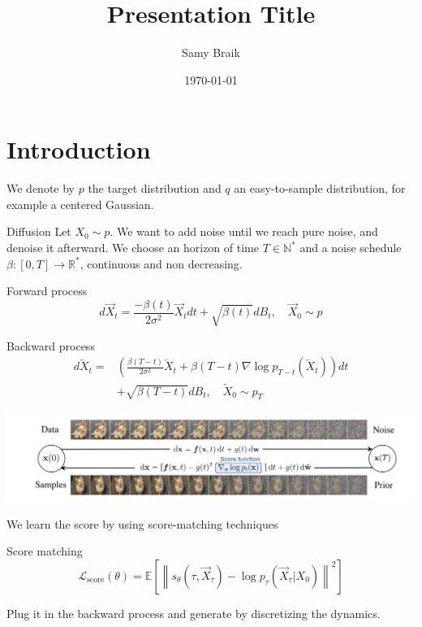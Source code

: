 \documentclass{beamer}
\title{Presentation Title}
\author{Samy Braik}
\date{\today}
\begin{document}
\begin{frame}
    \titlepage
\end{frame}

\section{Introduction}

\begin{frame}
    We denote by \(p\) the target distribution and \(q\) an easy-to-sample distribution, for example a centered Gaussian.
\end{frame}

\begin{frame}{Diffusion}
    Let \(X_0\sim p\). We want to add noise until we reach pure noise, and denoise it afterward. We choose an horizon of time \(T\in\mathbb{N}^*\) and a noise schedule \(\beta:[0,T]\rightarrow\mathbb{R}^*\), continuous and non decreasing.

    \begin{block}{Forward process}
            \[d\overrightarrow{X}_t = \frac{-\beta(t)}{2\sigma^2}\overrightarrow{X}_t dt + \sqrt{\beta(t)}dB_t, \quad \overrightarrow{X}_0\sim p\]
    \end{block}

    \begin{block}{Backward process}
        \begin{align*}
            d\overleftarrow{X}_t=&\left(  \frac{\beta(T-t)}{2\sigma^2}\overleftarrow{X}_t+\beta(T-t)\nabla\log p_{T-t}\left(\overleftarrow{X}_t \right)  \right)dt \\ &+ \sqrt{\beta(T-t)}dB_t, \quad \overleftarrow{X}_0\sim p_T
        \end{align*}
            
    \end{block}
\end{frame}

\begin{frame}
    \includegraphics[width=1\linewidth]{score_based_dog.png}
    \bigskip

    We learn the score by using score-matching techniques
    \begin{block}{Score matching}
        \[\mathcal{L}_\text{score}(\theta)=\mathbb{E}\left[ \left\| s_\theta \left(\tau,\overrightarrow{X}_\tau \right)-\log p_\tau \left(\overrightarrow{X}_\tau|X_0 \right)\right\|^2  \right]   \]
    \end{block}
    Plug it in the backward process and generate by discretizing the dynamics.
\end{frame}
\end{document}
